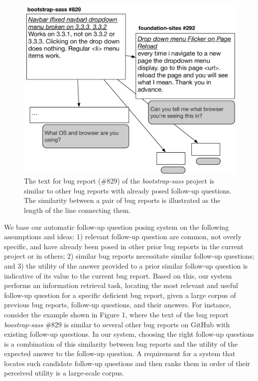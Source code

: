 \begin{figure}[t]
\centering
\includegraphics[width=0.99\linewidth]{figures/br_motivation.pdf}
\caption{The text for bug report (\#829) of the {\em bootstrap-sass} project is similar to other bug reports with already posed follow-up questions. The similarity between a pair of bug reports is illustrated as the length of the line connecting them.}
\label{fig:motivation}
\end{figure}


%
We base our automatic follow-up question posing system on the following assumptions and ideas: 1) relevant follow-up question are common, not overly specific, and have already been posed in other prior bug reports in the current project or in others; 2) similar bug reports necessitate similar follow-up questions; and 3) the utility of the answer provided to a prior similar follow-up question is indicative of its value to the current bug report.
%
Based on this, our system performs an information retrieval task, locating the most relevant and useful follow-up question for a specific deficient bug report, given a large corpus of previous bug reports, follow-up questions, and their answers.
%
For instance, consider the example shown in Figure 1, where the text of the bug report {\em boostrap-sass} \#829 is similar to several other bug reports on GitHub with existing follow-up questions.
%
In our system, choosing the right follow-up questions is a combination of this similarity between bug reports and the utility of the expected answer to the follow-up question.
%
A requirement for a system that locates such candidate follow-up questions and then ranks them in order of their perceived utility is a large-scale corpus.

